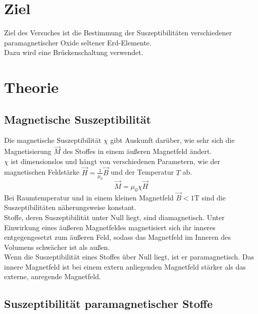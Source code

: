 \section{Ziel}
\label{sec:Ziel}

Ziel des Versuches ist die Bestimmung der Suszeptibilitäten
verschiedener paramagnetischer Oxide seltener Erd-Elemente.\\
Dazu wird eine Brückenschaltung verwendet.\\ 


\section{Theorie}
\label{sec:Theorie}

\subsection{Magnetische Suszeptibilität}

Die magnetische Suszeptibilität $\chi$ gibt Auskunft darüber, wie sehr sich 
die Magnetisierung $\vec{M}$ des Stoffes in einem äußeren Magnetfeld ändert.\\
$\chi$ ist dimensionslos und hängt von verschiedenen Parametern, wie der magnetischen Feldstärke
$\vec{H} = \frac{1}{\mu_0} \vec{B}$ und der Temperatur $T$ ab. \\
\begin{equation}
    \vec{M} = \mu_0 \chi \vec{H}
\end{equation}
Bei Raumtemperatur und in einem kleinen Magnetfeld $\vec{B} < 1 \mathrm{T}$ sind die Suszeptibilitäten
näherungsweise konstant. \\
Stoffe, deren Suszeptibilität unter Null liegt, sind diamagnetisch. Unter Einwirkung eines äußeren Magnetfeldes
magnetisiert sich ihr inneres entgegengesetzt zum äußeren Feld, sodass 
das Magnetfeld im Inneren des Volumens schwächer ist als außen. \\
Wenn die Suszeptibilität eines Stoffes über Null liegt, ist er paramagnetisch. 
Das innere Magnetfeld ist bei einem extern anliegenden Magnetfeld stärker als das externe, anregende Magnetfeld.\\



\subsection{Suszeptibilität paramagnetischer Stoffe}

